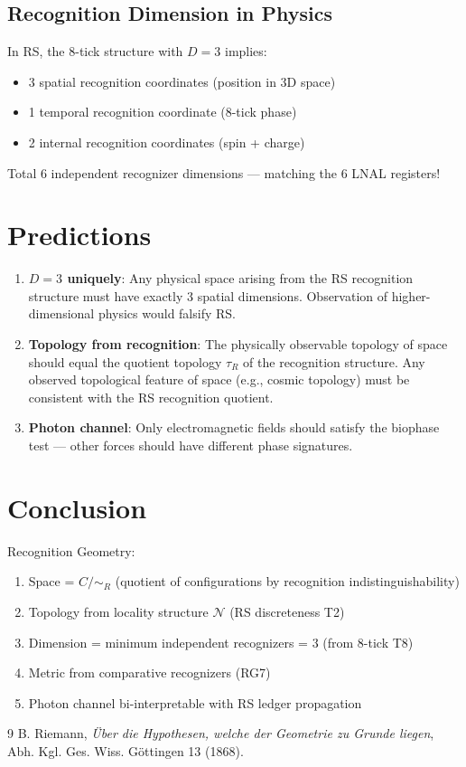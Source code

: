 \documentclass[12pt,a4paper]{article}
\theoremstyle{definition}
\theoremstyle{remark}
\begin{document}
\subsection{Recognition Dimension in Physics}

In RS, the 8-tick structure with $D = 3$ implies:
\begin{itemize}
\item 3 spatial recognition coordinates (position in 3D space)
\item 1 temporal recognition coordinate (8-tick phase)
\item 2 internal recognition coordinates (spin + charge)
\end{itemize}

Total 6 independent recognizer dimensions — matching the 6 LNAL registers!

\section{Predictions}

\begin{enumerate}
\item \textbf{$D = 3$ uniquely}: Any physical space arising from the RS recognition 
structure must have exactly 3 spatial dimensions. Observation of higher-dimensional 
physics would falsify RS.

\item \textbf{Topology from recognition}: The physically observable topology of space 
should equal the quotient topology $\tau_R$ of the recognition structure. Any 
observed topological feature of space (e.g., cosmic topology) must be consistent 
with the RS recognition quotient.

\item \textbf{Photon channel}: Only electromagnetic fields should satisfy the 
biophase test — other forces should have different phase signatures.
\end{enumerate}

\section{Conclusion}

Recognition Geometry:
\begin{enumerate}
\item Space = $C/\sim_R$ (quotient of configurations by recognition indistinguishability)
\item Topology from locality structure $\mathcal{N}$ (RS discreteness T2)
\item Dimension = minimum independent recognizers = 3 (from 8-tick T8)
\item Metric from comparative recognizers (RG7)
\item Photon channel bi-interpretable with RS ledger propagation
\end{enumerate}

\begin{thebibliography}{9}
 B. Riemann, \emph{Über die Hypothesen, welche der Geometrie zu Grunde liegen}, 
Abh. Kgl. Ges. Wiss. Göttingen 13 (1868).
\end{thebibliography}
\end{document}
